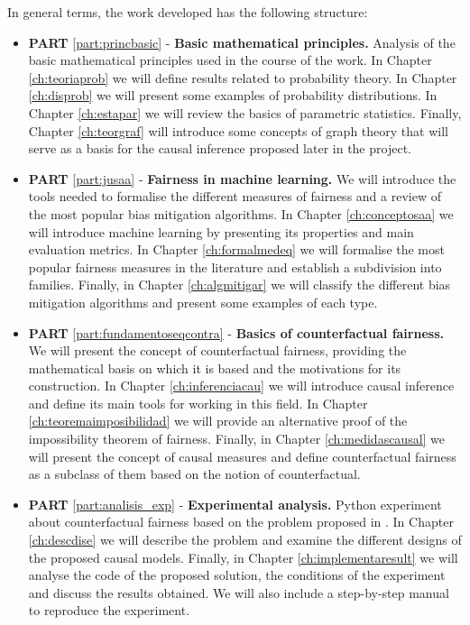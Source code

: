 In general terms, the work developed has the following structure:

\begin{itemize}
    \item \textbf{PART} \ref{part:princbasic} - \textbf{Basic mathematical principles.} Analysis of the basic mathematical principles used in the course of the work. In Chapter \ref{ch:teoriaprob} we will define results related to probability theory. In Chapter \ref{ch:disprob} we will present some examples of probability distributions. In Chapter \ref{ch:estapar} we will review the basics of parametric statistics. Finally, Chapter \ref{ch:teorgraf} will introduce some concepts of graph theory that will serve as a basis for the causal inference proposed later in the project.
    \item \textbf{PART} \ref{part:jusaa} - \textbf{Fairness in machine learning.} We will introduce the tools needed to formalise the different measures of fairness and a review of the most popular bias mitigation algorithms. In Chapter \ref{ch:conceptosaa} we will introduce machine learning by presenting its properties and main evaluation metrics. In Chapter \ref{ch:formalmedeq} we will formalise the most popular fairness measures in the literature and establish a subdivision into families. Finally, in Chapter \ref{ch:algmitigar} we will classify the different bias mitigation algorithms and present some examples of each type.
    \item \textbf{PART} \ref{part:fundamentoseqcontra} - \textbf{Basics of counterfactual fairness.} We will present the concept of counterfactual fairness, providing the mathematical basis on which it is based and the motivations for its construction. In Chapter \ref{ch:inferenciacau} we will introduce causal inference and define its main tools for working in this field. In Chapter \ref{ch:teoremaimposibilidad} we will provide an alternative proof of the impossibility theorem of fairness. Finally, in Chapter \ref{ch:medidascausal} we will present the concept of causal measures and define counterfactual fairness as a subclass of them based on the notion of counterfactual.
    \clearpage
    \item \textbf{PART} \ref{part:analisis_exp} - \textbf{Experimental analysis.} Python experiment about counterfactual fairness based on the problem proposed in \cite{counterfactual2018}. In Chapter \ref{ch:descdise} we will describe the problem and examine the different designs of the proposed causal models. Finally, in Chapter \ref{ch:implementaresult} we will analyse the code of the proposed solution, the conditions of the experiment and discuss the results obtained. We will also include a step-by-step manual to reproduce the experiment.

\end{itemize}
